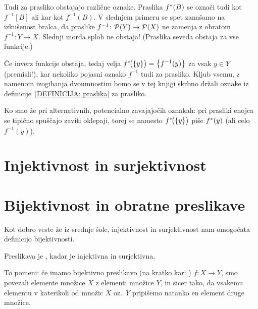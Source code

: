                 \begin{opomba}
                        Tudi za prasliko obstajajo različne oznake. Praslika $\pim{f}{B}$ se označi tudi kot $f^{-1}[B]$ ali kar kot $f^{-1}(B)$. V slednjem primeru se spet zanašamo na izkušenost bralca, da praslike $f^{-1}\colon \mathcal{P}(Y) \to \mathcal{P}(X)$ ne zamenja z obratom $f^{-1}\colon Y \to X$. Slednji morda sploh ne obstaja! (Praslika seveda obstaja za vse funkcije.)

                        Če inverz funkcije obstaja, tedaj velja $\pim[1]{f}{\set{y}} = \set[1]{f^{-1}(y)}$ za vsak $y \in Y$ (premisli!), kar nekoliko pojasni oznako $f^{-1}$ tudi za prasliko. Kljub vsemu, z namenom izogibanja dvoumnostim bomo se v tej knjigi skrbno držali oznake iz definicije~\ref{DEFINICIJA: praslika} za prasliko.

                        Ko smo že pri alternativnih, potencialno zavajajočih oznakah: pri prasliki enojca se tipično spuščajo zaviti oklepaji, torej se namesto $\pim[1]{f}{\set{y}}$ piše $\pim{f}{y}$ (ali celo $f^{-1}(y)$).
                \end{opomba}




        \section{Injektivnost in surjektivnost}\label{RAZDELEK: Injektivnost in surjektivnost}



        \section{Bijektivnost in obratne preslikave}\label{RAZDELEK: Bijektivnost in obratne preslikave}

                Kot dobro veste že iz srednje šole, injektivnost in surjektivnost nam omogočata definicijo bijektivnosti.

                \begin{definicija}
                        Preslikava je , kadar je injektivna in surjektivna.
                \end{definicija}

                To pomeni: če imamo bijektivno preslikavo (na kratko kar: ) $f\colon X \to Y$, smo povezali elemente množice $X$ z elementi množice $Y$, in sicer tako, da vsakemu elementu v katerikoli od množic $X$ oz.~$Y$ pripišemo natanko en element druge množice.

